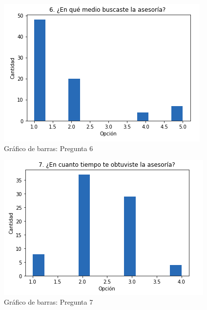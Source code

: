            \begin{figure}[H]
                \centering
                \includegraphics[width=.8\linewidth]{Latex/Classes/Imagenes/6.png}
                \caption{Gráfico de barras: Pregunta 6}
            \end{figure}
            \begin{figure}[H]
                \centering
                \includegraphics[width=.8\linewidth]{Latex/Classes/Imagenes/7.png}
                \caption{Gráfico de barras: Pregunta 7}
            \end{figure}
